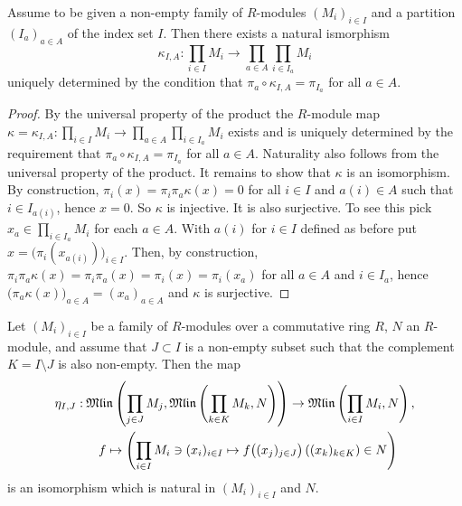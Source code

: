 \begin{lemma}\label{thm:associator-cartesian-product}
  Assume to be given a non-empty family of $R$-modules $(M_i)_{i\in I}$ and a partition 
  $(I_a)_{a \in A}$ of the index set $I$. Then there exists a natural ismorphism
  \[
    \kappa_{I,A}:  \prod_{i \in I} M_i \to \prod_{a \in A}  \prod_{i \in I_a} M_i
  \]
  uniquely determined by the condition that $\pi_a \circ \kappa_{I,A} = \pi_{I_a}$ for all
  $a\in A$.
\end{lemma}
\begin{proof}
  By the universal property of the product the $R$-module map 
  $ \kappa = \kappa_{I,A}:  \prod_{i \in I} M_i \to \prod_{a \in A}  \prod_{i \in I_a} M_i$
  exists and is uniquely determined by the requirement  that $\pi_a \circ \kappa_{I,A} = \pi_{I_a}$
  for all $a\in A$. Naturality also follows from the universal property of the product.
  It remains to show that $\kappa$ is an isomorphism. By construction,
  $\pi_i(x) = \pi_i \pi_a \kappa (x) =0$ for all $i\in I$ and $a(i)\in A$ such that $i\in I_{a(i)}$,
  hence $x=0$.
  So $\kappa$ is injective. It is also surjective. To see this pick $x_a \in \prod_{i \in I_a} M_i$
  for each $a\in A$. With $a(i)$ for $i\in I$ defined as before put
  $x = \big( \pi_i (x_{a(i)} )\big)_{i\in I}$. Then, by construction,
  $\pi_i \pi_{a} \kappa (x) = \pi_i \pi_{a} (x) = \pi_i (x) = \pi_i (x_{a})$ for all $a\in A$ and
  $i\in I_a$,
  hence $\big(\pi_a \kappa (x) \big)_{a \in A} = (x_a)_{a \in A}$
  and $\kappa$ is surjective. 
\end{proof}

\begin{proposition}
\label{thm:exponential-law-multilinear-maps}
  Let $(M_i)_{i\in I}$ be a family of $R$-modules over a commutative ring $R$,
  $N$ an $R$-module, 
  and assume that $J \subset I$ is a non-empty subset such that the complement
  $K = I\setminus J$ is also non-empty. Then the map
  \begin{equation*}
  \begin{split}
    \eta_{I,J}: \:&
    \mathfrak{Mlin} \left( \prod_{j\in J} M_j , \mathfrak{Mlin} \left(\prod_{k\in K} M_k ,N \right)\right)
    \rightarrow \mathfrak{Mlin} \left( \prod_{i\in I} M_i, N \right), \\
    & \hspace{1em} f \mapsto \left( \prod_{i\in I} M_i\ni (x_i)_{i\in I} \mapsto
    f\big( (x_j)_{j\in J} \big)\left( (x_k)_{k\in K} \right)  \in N \right) 
  \end{split}
  \end{equation*}
  is an isomorphism which is natural in $(M_i)_{i\in I}$ and $N$.
\end{proposition}

